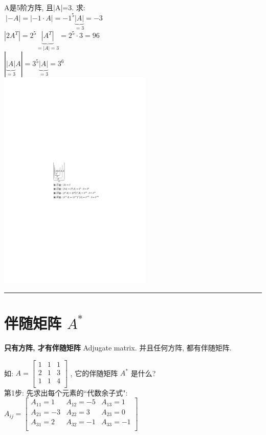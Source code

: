 \documentclass[UTF8]{ctexart}
\begin{document}
\begin{myEnvSample}
A是5阶方阵, 且|A|=3. 求:  \\
$
\ |-A|=|-1\cdot A|=-1^5\underset{=3}{\underbrace{|A|}}=-3
$\\
$
|2A^T|=2^5\underset{=|A|=3}{\underbrace{|A^T|}}=2^5\cdot 3=96
$\\
$
\left| \underset{=3}{\underbrace{\left| A \right|}}A \right|=3^5\underset{=3}{\underbrace{|A|}}=3^6
$\\

\includegraphics[width=0.55\textwidth]{img/0024.pdf}
\end{myEnvSample}



\hrule


\section{伴随矩阵  $A^*$}

\textbf{只有方阵, 才有伴随矩阵} Adjugate matrix. 并且任何方阵, 都有伴随矩阵.

如: $A=\left[ \begin{matrix}
	1&		1&		1\\
	\hline
	2&		1&		3\\
	\hline
	1&		1&		4\\
\end{matrix} \right] $ , 它的伴随矩阵 $A^*$ 是什么? \\

第1步: 先求出每个元素的``代数余子式": \\
$
A_{ij}=\left[ \begin{matrix}
	A_{11}=1&		A_{12}=-5&		A_{13}=1\\
	A_{21}=-3&		A_{22}=3&		A_{23}=0\\
	A_{31}=2&		A_{32}=-1&		A_{33}=-1\\
\end{matrix} \right]
$\\
\end{document}
